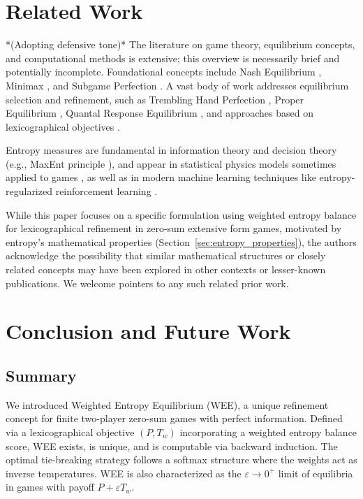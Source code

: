 \documentclass{article}
\begin{document}
\section{Related Work}
*(Adopting defensive tone)*
The literature on game theory, equilibrium concepts, and computational methods is extensive; this overview is necessarily brief and potentially incomplete. Foundational concepts include Nash Equilibrium \cite{placeholder_nash}, Minimax \cite{placeholder_vonneumann}, and Subgame Perfection \cite{placeholder_selten_spe}. A vast body of work addresses equilibrium selection and refinement, such as Trembling Hand Perfection \cite{placeholder_selten_thpe}, Proper Equilibrium \cite{placeholder_myerson}, Quantal Response Equilibrium \cite{placeholder_qre}, and approaches based on lexicographical objectives \cite{placeholder_lexico_games}.

Entropy measures are fundamental in information theory \cite{placeholder_cover_thomas} and decision theory (e.g., MaxEnt principle \cite{placeholder_jaynes}), and appear in statistical physics models sometimes applied to games \cite{placeholder_statphys_games}, as well as in modern machine learning techniques like entropy-regularized reinforcement learning \cite{placeholder_entropy_rl}.

While this paper focuses on a specific formulation using weighted entropy balance for lexicographical refinement in zero-sum extensive form games, motivated by entropy's mathematical properties (Section~\ref{sec:entropy_properties}), the authors acknowledge the possibility that similar mathematical structures or closely related concepts may have been explored in other contexts or lesser-known publications. We welcome pointers to any such related prior work.

\section{Conclusion and Future Work}

\subsection{Summary}
We introduced Weighted Entropy Equilibrium (WEE), a unique refinement concept for finite two-player zero-sum games with perfect information. Defined via a lexicographical objective $(P, T_w)$ incorporating a weighted entropy balance score, WEE exists, is unique, and is computable via backward induction. The optimal tie-breaking strategy follows a softmax structure where the weights act as inverse temperatures. WEE is also characterized as the $\varepsilon \to 0^+$ limit of equilibria in games with payoff $P + \varepsilon T_w$.
\end{document}
